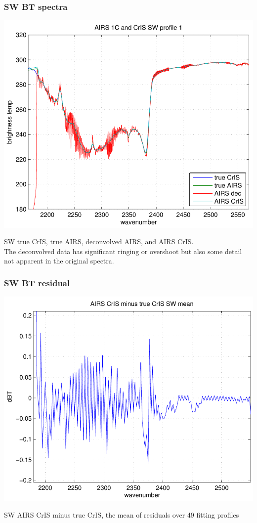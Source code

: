 \documentclass[11pt]{beamer}
\begin{document}
\begin{frame}
\frametitle{SW BT spectra}

\begin{center}
  \includegraphics[scale=0.54]{figures/fig_1_SW.pdf}
\end{center}

SW true CrIS, true AIRS, deconvolved AIRS, and AIRS CrIS.  \\
The deconvolved data has significant ringing or overshoot but also
some detail not apparent in the original spectra.

\end{frame}
\begin{frame}
\frametitle{SW BT residual}

\begin{center}
  \includegraphics[scale=0.54]{figures/fig_2_SW.pdf}
\end{center}

SW AIRS CrIS minus true CrIS, the mean of residuals over 49 fitting
profiles

\end{frame}
\end{document}
